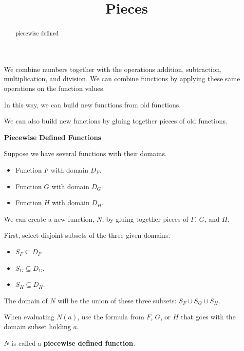 \documentclass{ximera}
\title{Pieces}
\begin{document}
\begin{abstract}
piecewise defined
\end{abstract}
\maketitle



We combine numbers together with the operations addition, subtraction, multiplication, and division.  We can combine functions by applying these same operations on the function values.  

In this way, we can build new functions from old functions. 

We can also build new functions by gluing together pieces of old functions.



\begin{template} \textbf{\textcolor{blue!55!black}{Piecewise Defined Functions}} 


Suppose we have several functions with their domains.

\begin{itemize}
\item Function $F$ with domain $D_F$. 
\item Function $G$ with domain $D_G$. 
\item Function $H$ with domain $D_H$. 
\end{itemize}


We can create a new function, $N$, by gluing together pieces of $F$, $G$, and $H$.


First, select disjoint subsets of the three given domains.


\begin{itemize}
\item $S_F \subseteq D_F$. 
\item $S_G \subseteq D_G$. 
\item $S_H \subseteq D_H$. 
\end{itemize}


The domain of $N$ will be the union of these three subsets: $S_F \cup S_G \cup S_H$. 

When evaluating $N(a)$, use the formula from $F$, $G$, or $H$ that goes with the domain subset holding $a$.


\end{template}

$N$ is called a \textbf{\textcolor{blue!55!black}{piecewise defined function}}. 
\end{document}
